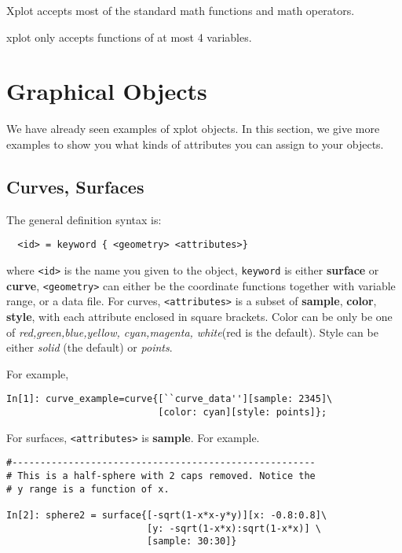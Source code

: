 Xplot accepts most of the standard math functions and
math operators. 

xplot only accepts functions of at most 4 variables.
\vspace{5mm}

\section{Graphical Objects}
We have already seen examples of xplot objects. In this
section, we give more examples to show you what kinds of
attributes you can assign to your objects.
\subsection{Curves, Surfaces}
The general definition syntax is:
\begin{verbatim}
  <id> = keyword { <geometry> <attributes>}
\end{verbatim}
where \verb+<id>+ is the name you given to the object,
\verb+keyword+ is either {\bf surface} or {\bf curve},
\verb+<geometry>+ can either be the coordinate functions
together with variable range, or a data file. For curves,
\verb+<attributes>+ is a subset of {\bf sample}, {\bf color}, {\bf style},
with each attribute enclosed in square brackets.
Color can be only be one of {\it red,green,blue,yellow,
cyan,magenta, white}(red is the default). 
Style can be either {\it solid} (the default)
or {\it points}.


For example, 
\begin{verbatim}
In[1]: curve_example=curve{[``curve_data''][sample: 2345]\
                           [color: cyan][style: points]};
\end{verbatim}

For surfaces, \verb+<attributes>+ is {\bf sample}. 
For example.
\begin{verbatim}
#------------------------------------------------------
# This is a half-sphere with 2 caps removed. Notice the
# y range is a function of x.

In[2]: sphere2 = surface{[-sqrt(1-x*x-y*y)][x: -0.8:0.8]\
                         [y: -sqrt(1-x*x):sqrt(1-x*x)] \
                         [sample: 30:30]}

\end{verbatim}

